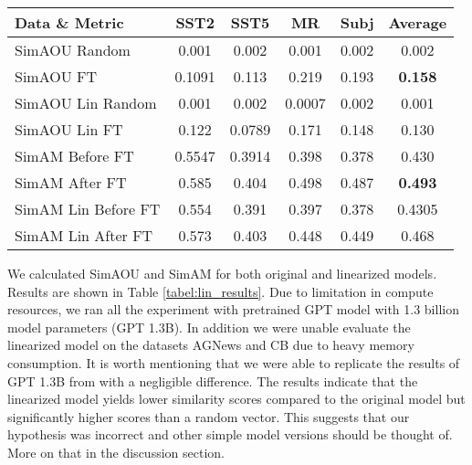 \begin{table*}[t]
	\centering
	\caption{SimAOU and SimAM on four datasets, comparing similarity between random and finetune for both original model and liniarization of the model.}
	\label{tabel:lin_results}
	\begin{tabular}{|l|cccc|c|}
		\hline
		Data \& Metric      & SST2   & SST5   & MR     & Subj  & Average        \\ \hline
		SimAOU Random       & 0.001  & 0.002  & 0.001  & 0.002 & 0.002          \\
		SimAOU FT           & 0.1091 & 0.113  & 0.219  & 0.193 & \textbf{0.158} \\
		SimAOU Lin Random   & 0.001  & 0.002  & 0.0007 & 0.002 & 0.001          \\
		SimAOU Lin FT       & 0.122  & 0.0789 & 0.171  & 0.148 & 0.130          \\ \hline
		SimAM Before FT     & 0.5547 & 0.3914 & 0.398  & 0.378 & 0.430          \\
		SimAM After FT      & 0.585  & 0.404  & 0.498  & 0.487 & \textbf{0.493} \\
		SimAM Lin Before FT & 0.554  & 0.391  & 0.397  & 0.378 & 0.4305         \\
		SimAM Lin After FT  & 0.573  & 0.403  & 0.448  & 0.449 & 0.468          \\ \hline
	\end{tabular}
\end{table*}

We calculated SimAOU and SimAM for both original and linearized models. Results are shown in Table \ref{tabel:lin_results}.
Due to limitation in compute resources, we ran all the experiment with pretrained GPT model with 1.3 billion model parameters (GPT 1.3B). In addition we were unable evaluate the linearized model on the datasets AGNews and CB due to heavy memory consumption. It is worth mentioning that we were able to replicate the results of GPT 1.3B from \cite{dai2023gpt} with a negligible difference.
The results indicate that the linearized model yields lower similarity scores compared to the original model but significantly higher scores than a random vector. This suggests that our hypothesis was incorrect and other simple model versions should be thought of. More on that in the discussion section.

